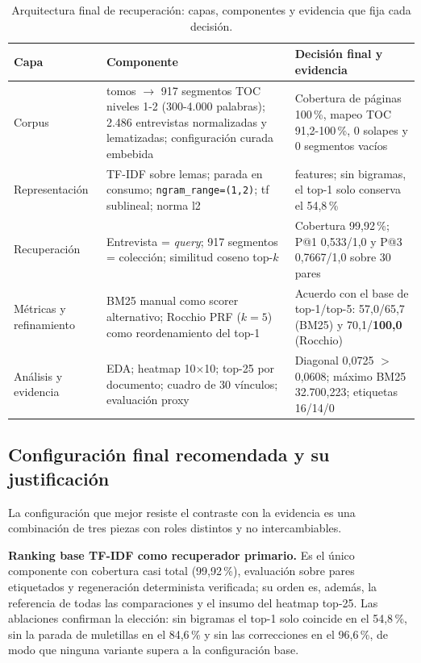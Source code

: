 \documentclass[11pt]{tg_usta}
\begin{document}
\begin{table}[htbp]
    \centering
    \caption{Arquitectura final de recuperación: capas, componentes y evidencia que fija cada decisión.}
    \footnotesize
    \setlength{\tabcolsep}{4pt}
    \begin{tabular}{>{\raggedright\arraybackslash}p{2.1cm} >{\raggedright\arraybackslash}p{5.8cm} >{\raggedright\arraybackslash}p{6.4cm}}
    \toprule
    Capa & Componente & Decisión final y evidencia \\
    \midrule
    Corpus & 10 tomos $\rightarrow$ 917 segmentos TOC niveles 1-2 (300-4.000 palabras); 2.486 entrevistas normalizadas y lematizadas; configuración curada embebida & Cobertura de páginas 100\,\%, mapeo TOC 91,2-100\,\%, 0 solapes y 0 segmentos vacíos \\
    Representación & TF-IDF sobre lemas; parada en consumo; \texttt{ngram\_range=(1,2)}; tf sublineal; norma l2 & 118.748 features; sin bigramas, el top-1 solo conserva el 54,8\,\% \\
    Recuperación & Entrevista = \textit{query}; 917 segmentos = colección; similitud coseno top-$k$ & Cobertura 99,92\,\%; P@1 0,533/1,0 y P@3 0,7667/1,0 sobre 30 pares \\
    Métricas y refinamiento & BM25 manual como scorer alternativo; Rocchio PRF ($k=5$) como reordenamiento del top-1 & Acuerdo con el base de top-1/top-5: 57,0/65,7 (BM25) y 70,1/\textbf{100,0} (Rocchio) \\
    Análisis y evidencia & EDA; heatmap 10$\times$10; top-25 por documento; cuadro de 30 vínculos; evaluación proxy & Diagonal 0,0725 $>$ 0,0608; máximo BM25 32.700,223; etiquetas 16/14/0 \\
    \bottomrule
    \end{tabular}
    \label{tab:arquitectura}
\end{table}

\subsection{Configuración final recomendada y su justificación}

La configuración que mejor resiste el contraste con la evidencia es una combinación de tres piezas con roles distintos y no intercambiables.

\textbf{Ranking base TF-IDF como recuperador primario.} Es el único componente con cobertura casi total (99,92\,\%), evaluación sobre pares etiquetados y regeneración determinista verificada; su orden es, además, la referencia de todas las comparaciones y el insumo del heatmap top-25. Las ablaciones confirman la elección: sin bigramas el top-1 solo coincide en el 54,8\,\%, sin la parada de muletillas en el 84,6\,\% y sin las correcciones en el 96,6\,\%, de modo que ninguna variante supera a la configuración base.
\end{document}
